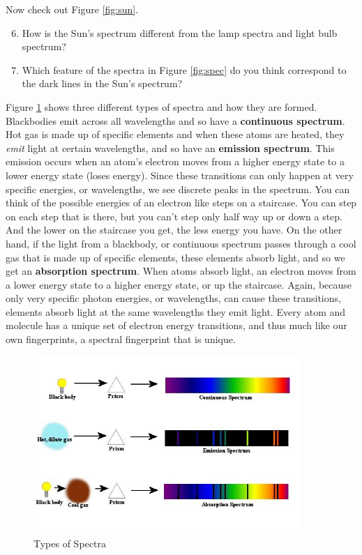 \documentclass[11pt]{article}
\begin{document}
\noindent
Now check out Figure \ref{fig:sun}.
\begin{enumerate}
    \setcounter{enumi}{5}
    \item How is the Sun's spectrum different from the lamp spectra and light bulb spectrum?
    \item Which feature of the spectra in Figure \ref{fig:spec} do you think correspond to the dark lines in the Sun's spectrum?
\end{enumerate}


\noindent
Figure \ref{fig:types} shows three different types of spectra and how they are formed. Blackbodies emit across all wavelengths and so have a \textbf{continuous spectrum}. Hot gas is made up of specific elements and when these atoms are heated, they \textit{emit} light at certain wavelengths, and so have an \textbf{emission spectrum}.  This emission occurs when an atom's electron moves from a higher energy state to a lower energy state (loses energy).  Since these transitions can only happen at very specific energies, or wavelengths, we see discrete peaks in the spectrum.  You can think of the possible energies of an electron like steps on a staircase.  You can step on each step that is there, but you can't step only half way up or down a step. And the lower on the staircase you get, the less energy you have.  On the other hand, if the light from a blackbody, or continuous spectrum passes through a cool gas that is made up of specific elements, these elements absorb light, and so we get an \textbf{absorption spectrum}. When atoms absorb light, an electron moves from a lower energy state to a higher energy state, or up the staircase. Again, because only very specific photon energies, or wavelengths, can cause these transitions, elements absorb light at the same wavelengths they emit light.  Every atom and molecule has a unique set of electron energy transitions, and thus much like our own fingerprints, a spectral fingerprint that is unique.

\begin{figure}[h!]
    \centering
    \includegraphics[width=0.9\textwidth,trim={0cm 2cm 0cm 1cm},clip]{Images/emission_v_absorption.jpg}
    \caption{Types of Spectra}
    \label{fig:types}
\end{figure}
\end{document}
